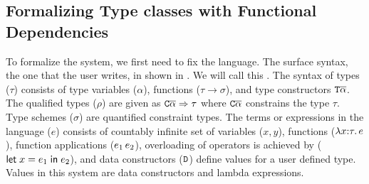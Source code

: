 \documentclass[format=sigplan,manuscript,review,screen,nonacm,margin=1in]{acmart}
\begin{document}
\subsection{Formalizing Type classes with Functional Dependencies}\label{subsec:tc-formal}
To formalize the system, we first need to fix the language.
The surface syntax, the one that the user writes, in shown in .
We will call this \TCFD{}.
The syntax of types ($\tau$) consists of  type variables ($\alpha$),
functions ($\tau\to\sigma$), and type constructors $\texttt{T}\overline{\alpha}$.
The qualified types ($\rho$) are given as $\texttt{C}\overline{\alpha}\Rightarrow\tau$
where $\texttt{C}\overline{\alpha}$ constrains the type $\tau$. Type schemes ($\sigma$) are quantified constraint types.
The terms or expressions in the language ($e$) consists of countably
infinite set of variables ($x, y$), functions ($\lambda x{:}\tau.\, e$),
function applications ($e_1\, e_2$), overloading of operators is achieved by ($\mathsf{let}\;x = e_1\;\mathsf{in}\;e_2$), and
data constructors ($\texttt{D}$) define values for a user defined type.
Values in this system are data constructors and lambda expressions.
\end{document}
